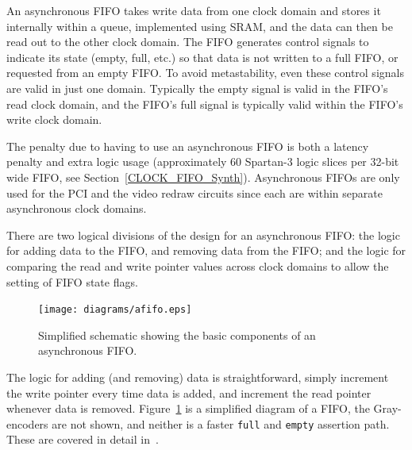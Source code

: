 
An asynchronous FIFO takes write data from one clock domain and stores it
internally within a queue, implemented using SRAM, and the data can then be read
out to the other clock domain. The FIFO generates control signals to indicate its
state (empty, full, etc.) so that data is not written to a full FIFO, or
requested from an empty FIFO. To avoid metastability, even these control signals
are valid in just one domain. Typically the empty signal is valid in the FIFO's
read clock domain, and the FIFO's full signal is typically valid within the
FIFO's write clock domain.

The penalty due to having to use an asynchronous FIFO is both a latency penalty
and extra logic usage (approximately 60 Spartan-3 logic slices per 32-bit wide
FIFO, see Section~\ref{CLOCK_FIFO_Synth}). Asynchronous FIFOs are only used for
the PCI and the video redraw circuits since each are within separate asynchronous
clock domains.

There are two logical divisions of the design for an asynchronous FIFO: the logic
for adding data to the FIFO, and removing data from the FIFO; and the logic for
comparing the read and write pointer values across clock domains to allow the
setting of FIFO state flags.

\begin{figure}[h!]
\begin{center}
\texttt{[image: diagrams/afifo.eps]}
\caption[Simplified Asynchronous FIFO Schematic]{Simplified schematic showing
the basic components of an asynchronous FIFO.}
\label{FIFO_Logic}
\end{center}
\end{figure}

The logic for adding (and removing) data is straightforward, simply increment the
write pointer every time data is added, and increment the read pointer whenever
data is removed. Figure~\ref{FIFO_Logic} is a simplified diagram of a FIFO, the
Gray-encoders are not shown, and neither is a faster \texttt{full} and
\texttt{empty} assertion path. These are covered in detail in~\cite{Async_FIFO2}.

